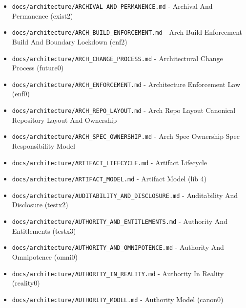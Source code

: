 \documentclass[10.5pt,a4paper,openany]{book}
\begin{document}
\begin{itemize}
\item \texttt{docs/\allowbreak{}architecture/\allowbreak{}ARCHIVAL\_\allowbreak{}AND\_\allowbreak{}PERMANENCE.\allowbreak{}md} -\allowbreak{} Archival And Permanence (exist2)
\item \texttt{docs/\allowbreak{}architecture/\allowbreak{}ARCH\_\allowbreak{}BUILD\_\allowbreak{}ENFORCEMENT.\allowbreak{}md} -\allowbreak{} Arch Build Enforcement Build And Boundary Lockdown (enf2)
\item \texttt{docs/\allowbreak{}architecture/\allowbreak{}ARCH\_\allowbreak{}CHANGE\_\allowbreak{}PROCESS.\allowbreak{}md} -\allowbreak{} Architectural Change Process (future0)
\item \texttt{docs/\allowbreak{}architecture/\allowbreak{}ARCH\_\allowbreak{}ENFORCEMENT.\allowbreak{}md} -\allowbreak{} Architecture Enforcement Law (enf0)
\item \texttt{docs/\allowbreak{}architecture/\allowbreak{}ARCH\_\allowbreak{}REPO\_\allowbreak{}LAYOUT.\allowbreak{}md} -\allowbreak{} Arch Repo Layout Canonical Repository Layout And Ownership
\item \texttt{docs/\allowbreak{}architecture/\allowbreak{}ARCH\_\allowbreak{}SPEC\_\allowbreak{}OWNERSHIP.\allowbreak{}md} -\allowbreak{} Arch Spec Ownership Spec Responsibility Model
\item \texttt{docs/\allowbreak{}architecture/\allowbreak{}ARTIFACT\_\allowbreak{}LIFECYCLE.\allowbreak{}md} -\allowbreak{} Artifact Lifecycle
\item \texttt{docs/\allowbreak{}architecture/\allowbreak{}ARTIFACT\_\allowbreak{}MODEL.\allowbreak{}md} -\allowbreak{} Artifact Model (lib 4)
\item \texttt{docs/\allowbreak{}architecture/\allowbreak{}AUDITABILITY\_\allowbreak{}AND\_\allowbreak{}DISCLOSURE.\allowbreak{}md} -\allowbreak{} Auditability And Disclosure (testx2)
\item \texttt{docs/\allowbreak{}architecture/\allowbreak{}AUTHORITY\_\allowbreak{}AND\_\allowbreak{}ENTITLEMENTS.\allowbreak{}md} -\allowbreak{} Authority And Entitlements (testx3)
\item \texttt{docs/\allowbreak{}architecture/\allowbreak{}AUTHORITY\_\allowbreak{}AND\_\allowbreak{}OMNIPOTENCE.\allowbreak{}md} -\allowbreak{} Authority And Omnipotence (omni0)
\item \texttt{docs/\allowbreak{}architecture/\allowbreak{}AUTHORITY\_\allowbreak{}IN\_\allowbreak{}REALITY.\allowbreak{}md} -\allowbreak{} Authority In Reality (reality0)
\item \texttt{docs/\allowbreak{}architecture/\allowbreak{}AUTHORITY\_\allowbreak{}MODEL.\allowbreak{}md} -\allowbreak{} Authority Model (canon0)

\end{itemize}
\end{document}
